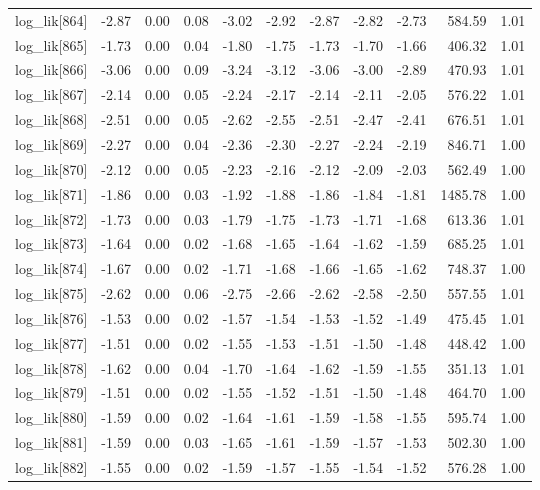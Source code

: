 \begin{table}[ht]
\begin{tabular}{rrrrrrrrrrr}
  log\_lik[864] & -2.87 & 0.00 & 0.08 & -3.02 & -2.92 & -2.87 & -2.82 & -2.73 & 584.59 & 1.01 \\ 
  log\_lik[865] & -1.73 & 0.00 & 0.04 & -1.80 & -1.75 & -1.73 & -1.70 & -1.66 & 406.32 & 1.01 \\ 
  log\_lik[866] & -3.06 & 0.00 & 0.09 & -3.24 & -3.12 & -3.06 & -3.00 & -2.89 & 470.93 & 1.01 \\ 
  log\_lik[867] & -2.14 & 0.00 & 0.05 & -2.24 & -2.17 & -2.14 & -2.11 & -2.05 & 576.22 & 1.01 \\ 
  log\_lik[868] & -2.51 & 0.00 & 0.05 & -2.62 & -2.55 & -2.51 & -2.47 & -2.41 & 676.51 & 1.01 \\ 
  log\_lik[869] & -2.27 & 0.00 & 0.04 & -2.36 & -2.30 & -2.27 & -2.24 & -2.19 & 846.71 & 1.00 \\ 
  log\_lik[870] & -2.12 & 0.00 & 0.05 & -2.23 & -2.16 & -2.12 & -2.09 & -2.03 & 562.49 & 1.00 \\ 
  log\_lik[871] & -1.86 & 0.00 & 0.03 & -1.92 & -1.88 & -1.86 & -1.84 & -1.81 & 1485.78 & 1.00 \\ 
  log\_lik[872] & -1.73 & 0.00 & 0.03 & -1.79 & -1.75 & -1.73 & -1.71 & -1.68 & 613.36 & 1.01 \\ 
  log\_lik[873] & -1.64 & 0.00 & 0.02 & -1.68 & -1.65 & -1.64 & -1.62 & -1.59 & 685.25 & 1.01 \\ 
  log\_lik[874] & -1.67 & 0.00 & 0.02 & -1.71 & -1.68 & -1.66 & -1.65 & -1.62 & 748.37 & 1.00 \\ 
  log\_lik[875] & -2.62 & 0.00 & 0.06 & -2.75 & -2.66 & -2.62 & -2.58 & -2.50 & 557.55 & 1.01 \\ 
  log\_lik[876] & -1.53 & 0.00 & 0.02 & -1.57 & -1.54 & -1.53 & -1.52 & -1.49 & 475.45 & 1.01 \\ 
  log\_lik[877] & -1.51 & 0.00 & 0.02 & -1.55 & -1.53 & -1.51 & -1.50 & -1.48 & 448.42 & 1.00 \\ 
  log\_lik[878] & -1.62 & 0.00 & 0.04 & -1.70 & -1.64 & -1.62 & -1.59 & -1.55 & 351.13 & 1.01 \\ 
  log\_lik[879] & -1.51 & 0.00 & 0.02 & -1.55 & -1.52 & -1.51 & -1.50 & -1.48 & 464.70 & 1.00 \\ 
  log\_lik[880] & -1.59 & 0.00 & 0.02 & -1.64 & -1.61 & -1.59 & -1.58 & -1.55 & 595.74 & 1.00 \\ 
  log\_lik[881] & -1.59 & 0.00 & 0.03 & -1.65 & -1.61 & -1.59 & -1.57 & -1.53 & 502.30 & 1.00 \\ 
  log\_lik[882] & -1.55 & 0.00 & 0.02 & -1.59 & -1.57 & -1.55 & -1.54 & -1.52 & 576.28 & 1.00 \\ 

\end{tabular}
\end{table}
